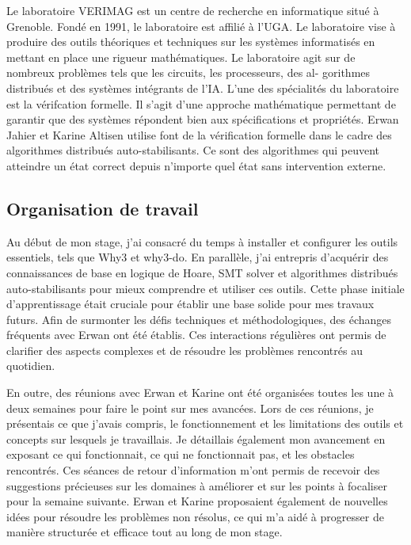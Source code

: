 \documentclass[11pt]{article}
\begin{document}
   Le laboratoire VERIMAG est un centre de recherche en informatique situé à Grenoble. Fondé
en 1991, le laboratoire est affilié à l’UGA. Le laboratoire vise à produire des outils théoriques
et techniques sur les systèmes informatisés en mettant en place une rigueur mathématiques.
Le laboratoire agit sur de nombreux problèmes tels que les circuits, les processeurs, des al-
gorithmes distribués et des systèmes intégrants de l’IA.
L’une des spécialités du laboratoire est la vérifcation formelle. Il s’agit d’une approche
mathématique permettant de garantir que des systèmes répondent bien aux spécifications
et propriétés. Erwan Jahier et Karine Altisen utilise font de la vérification formelle dans le 
cadre des algorithmes distribués auto-stabilisants. Ce sont des algorithmes qui peuvent 
atteindre un état correct depuis n'importe quel état sans intervention externe.


\subsection{Organisation de travail}
\label{sec:org8906b59}

Au début de mon stage, j'ai consacré du temps à installer et configurer les outils essentiels, tels que Why3 et why3-do. 
En parallèle, j'ai entrepris d'acquérir des connaissances de base en logique de Hoare, 
SMT solver et algorithmes distribués auto-stabilisants pour mieux comprendre et utiliser ces outils. 
Cette phase initiale d'apprentissage était cruciale pour établir une base solide pour mes travaux futurs. 
Afin de surmonter les défis techniques et méthodologiques, des échanges fréquents avec Erwan ont été établis. 
Ces interactions régulières ont permis de clarifier des aspects complexes et de résoudre les problèmes rencontrés au quotidien.

En outre, des réunions avec Erwan et Karine ont été organisées toutes les une à deux semaines pour faire le point sur mes avancées. 
Lors de ces réunions, je présentais ce que j'avais compris, le fonctionnement et les limitations des outils et concepts sur lesquels je travaillais. 
Je détaillais également mon avancement en exposant ce qui fonctionnait, ce qui ne fonctionnait pas, et les obstacles rencontrés. 
Ces séances de retour d'information m'ont permis de recevoir des suggestions précieuses sur les domaines à améliorer 
et sur les points à focaliser pour la semaine suivante. Erwan et Karine proposaient également de nouvelles idées pour résoudre les problèmes non résolus,
 ce qui m'a aidé à progresser de manière structurée et efficace tout au long de mon stage.
\end{document}
